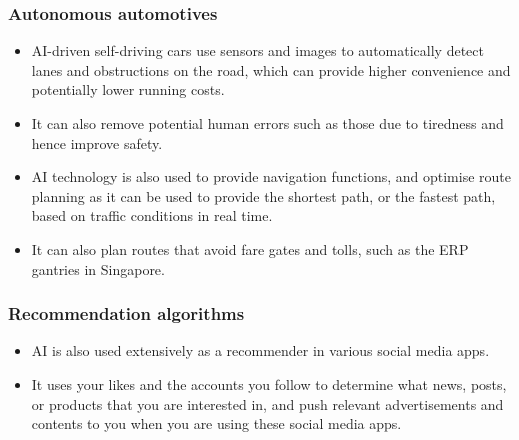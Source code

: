 \documentclass[11pt]{article}
\begin{document}
\subsubsection{Autonomous automotives}
\label{sec:org7c1bbba}
\begin{itemize}
\item AI-driven self-driving cars use sensors and images to automatically detect lanes and obstructions on the road, which can provide higher convenience and potentially lower running costs.
\item It can also remove potential human errors such as those due to tiredness and hence improve safety.
\item AI technology is also used to provide navigation functions, and optimise route planning as it can be used to provide the shortest path, or the fastest path, based on traffic conditions in real time.
\item It can also plan routes that avoid fare gates and tolls, such as the ERP gantries in Singapore.
\end{itemize}
\subsubsection{Recommendation algorithms}
\label{sec:orgbc78097}
\begin{itemize}
\item AI is also used extensively as a recommender in various social media apps.
\item It uses your likes and the accounts you follow to determine what news, posts, or products that you are interested in, and push relevant advertisements and contents to you when you are using these social media apps.
\end{itemize}
\end{document}
